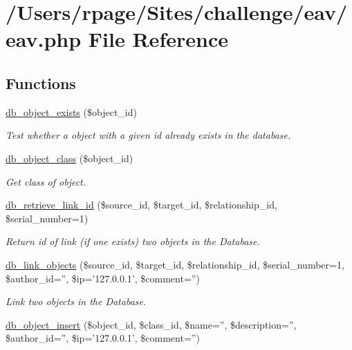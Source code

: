 \hypertarget{eav_8php}{
\section{/Users/rpage/Sites/challenge/eav/eav.php File Reference}
\label{eav_8php}
}
\subsection*{Functions}
\begin{CompactItemize}
\item 
\hyperlink{eav_8php_67d5d7031fc3a5d7cd9bd7ea66959eb2}{db\_\-object\_\-exists} (\$object\_\-id)
\begin{CompactList}\small\item\em Test whether a object with a given id already exists in the database. \item\end{CompactList}\item 
\hyperlink{eav_8php_7df7424ef9bab8c0fb6ae74d0b2d27fb}{db\_\-object\_\-class} (\$object\_\-id)
\begin{CompactList}\small\item\em Get class of object. \item\end{CompactList}\item 
\hyperlink{eav_8php_af41b9a208dee0874f2fb40ae2678586}{db\_\-retrieve\_\-link\_\-id} (\$source\_\-id, \$target\_\-id, \$relationship\_\-id, \$serial\_\-number=1)
\begin{CompactList}\small\item\em Return id of link (if one exists) two objects in the Database. \item\end{CompactList}\item 
\hyperlink{eav_8php_6bd82e0a9e6fd2965fb51b7c0e271156}{db\_\-link\_\-objects} (\$source\_\-id, \$target\_\-id, \$relationship\_\-id, \$serial\_\-number=1, \$author\_\-id='', \$ip='127.0.0.1', \$comment='')
\begin{CompactList}\small\item\em Link two objects in the Database. \item\end{CompactList}\item 
\hyperlink{eav_8php_d520925b88a5b09159cc582122b40af8}{db\_\-object\_\-insert} (\$object\_\-id, \$class\_\-id, \$name='', \$description='', \$author\_\-id='', \$ip='127.0.0.1', \$comment='')

\end{CompactItemize}
